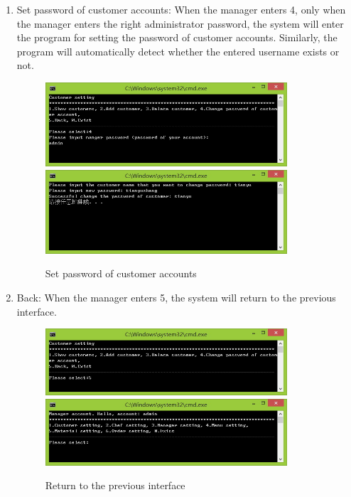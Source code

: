 \documentclass{article}
\begin{document}
\begin{enumerate}
    \item Set password of customer accounts:\newline 
    When the manager enters 4, only when the manager enters the right administrator password, the system will enter the program for setting the password of customer accounts. Similarly, the program will automatically detect whether the entered username exists or not.
        \begin{figure}[H]
        \centering
        \includegraphics[width=0.85\textwidth]{A/A4b0.jpg}
        \includegraphics[width=0.85\textwidth]{A/A4b1.jpg}
        \caption{Set password of customer accounts}
        \end{figure}
    
    \item Back:\newline 
    When the manager enters 5, the system will return to the previous interface.
        \begin{figure}[H]
        \centering
        \includegraphics[width=0.85\textwidth]{A/A5a.jpg}
        \includegraphics[width=0.85\textwidth]{A/A5b.jpg}
        \caption{Return to the previous interface}
        \end{figure}
    

\end{enumerate}
\end{document}
